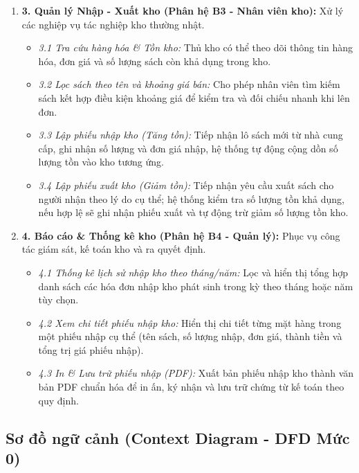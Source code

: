 \documentclass[12pt,a4paper]{article}
\begin{document}
\begin{enumerate}
    \item \textbf{3. Quản lý Nhập - Xuất kho (Phân hệ B3 - Nhân viên kho):} Xử lý các nghiệp vụ tác nghiệp kho thường nhật.
    \begin{itemize}
        \item \textit{3.1 Tra cứu hàng hóa \& Tồn kho:} Thủ kho có thể theo dõi thông tin hàng hóa, đơn giá và số lượng sách còn khả dụng trong kho.
        \item \textit{3.2 Lọc sách theo tên và khoảng giá bán:} Cho phép nhân viên tìm kiếm sách kết hợp điều kiện khoảng giá để kiểm tra và đối chiếu nhanh khi lên đơn.
        \item \textit{3.3 Lập phiếu nhập kho (Tăng tồn):} Tiếp nhận lô sách mới từ nhà cung cấp, ghi nhận số lượng và đơn giá nhập, hệ thống tự động cộng dồn số lượng tồn vào kho tương ứng.
        \item \textit{3.4 Lập phiếu xuất kho (Giảm tồn):} Tiếp nhận yêu cầu xuất sách cho người nhận theo lý do cụ thể; hệ thống kiểm tra số lượng tồn khả dụng, nếu hợp lệ sẽ ghi nhận phiếu xuất và tự động trừ giảm số lượng tồn kho.
    \end{itemize}

    \item \textbf{4. Báo cáo \& Thống kê kho (Phân hệ B4 - Quản lý):} Phục vụ công tác giám sát, kế toán kho và ra quyết định.
    \begin{itemize}
        \item \textit{4.1 Thống kê lịch sử nhập kho theo tháng/năm:} Lọc và hiển thị tổng hợp danh sách các hóa đơn nhập kho phát sinh trong kỳ theo tháng hoặc năm tùy chọn.
        \item \textit{4.2 Xem chi tiết phiếu nhập kho:} Hiển thị chi tiết từng mặt hàng trong một phiếu nhập cụ thể (tên sách, số lượng nhập, đơn giá, thành tiền và tổng trị giá phiếu nhập).
        \item \textit{4.3 In \& Lưu trữ phiếu nhập (PDF):} Xuất bản phiếu nhập kho thành văn bản PDF chuẩn hóa để in ấn, ký nhận và lưu trữ chứng từ kế toán theo quy định.
    \end{itemize}
\end{enumerate}

\newpage
\subsection{Sơ đồ ngữ cảnh (Context Diagram - DFD Mức 0)}
\label{subsec:dfd0}
\end{document}

